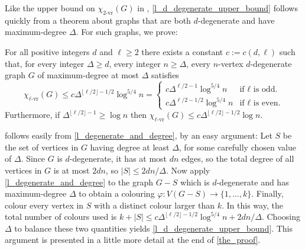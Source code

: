 \documentclass{patmorin}
\newcommand{\rn}[1]{\chi_{\operatorname{#1-vr}}}
\newcommand{\lrn}{\rn{\ell}}
\begin{document}
Like the upper bound on $\rn{2}(G)$ in \cite{karpas.neiman.ea:on}, \cref{l_d_degenerate_upper_bound} follows quickly from a theorem about graphs that are both $d$-degenerate and have maximum-degree $\Delta$. For such graphs, we prove:

\begin{thm}\label{l_degenerate_and_degree}
  For all positive integers $d$ and $\ell\ge 2$ there exists a constant $c:=c(d,\ell)$ such that, for every integer $\Delta\ge d$, every integer $n\ge \Delta$, every $n$-vertex $d$-degenerate graph $G$ of maximum-degree at most $\Delta$ satisfies
  \[
    \lrn(G)\le c\Delta^{\lfloor\ell/2\rfloor-1/2}\log^{5/4} n
    =\begin{cases}
    c\Delta^{\ell/2-1}\log^{5/4} n & \text{if $\ell$ is odd.} \\
    c\Delta^{\ell/2-1/2}\log^{5/4} n & \text{if $\ell$ is even.}
    \end{cases}
  \]
  Furthermore, if $\Delta^{\lfloor\ell/2\rfloor-1}\ge\log n$ then $\lrn(G)\le c\Delta^{\lfloor\ell/2\rfloor-1/2}\log n$.
\end{thm}

 follows easily from \cref{l_degenerate_and_degree}, by an easy argument:  Let $S$ be the set of vertices in $G$ having degree at least $\Delta$, for some carefully chosen value of $\Delta$.  Since $G$ is $d$-degenerate, it has at most $dn$ edges, so the total degree of all vertices in $G$ is at most $2dn$, so $|S|\le 2dn/\Delta$.  Now apply \cref{l_degenerate_and_degree} to the graph $G-S$ which is $d$-degenerate and has maximum-degree $\Delta$ to obtain a colouring $\varphi:V(G-S)\to\{1,\ldots,k\}$.  Finally, colour every vertex in $S$ with a distinct colour larger than $k$.  In this way, the total number of colours used is $k + |S|\le c\Delta^{\lfloor\ell/2\rfloor-1/2}\log^{5/4} n + 2dn/\Delta$. Choosing $\Delta$ to balance these two quantities yields \cref{l_d_degenerate_upper_bound}.  This argument is presented in a little more detail at the end of \cref{the_proof}.
\end{document}
